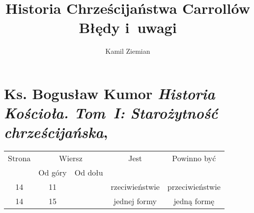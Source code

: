\documentclass[a4paper,11pt]{article}
\title{Historia Chrześcijaństwa Carrollów \\
  {\Large Błędy i~uwagi}}
\author{Kamil Ziemian}
\begin{document}





\maketitle  %









\section{Ks. Bogusław Kumor
  \textit{Historia Kościoła. Tom~I: Starożytność chrześcijańska},
  \cite{KumorHistoriaKosciolaVolI2003}}





\begin{center}

  \begin{tabular}{|c|c|c|c|c|}
    \hline
    Strona & \multicolumn{2}{c|}{Wiersz} & Jest
                              & Powinno być \\ \cline{2-3}
    & Od góry & Od dołu & & \\
    \hline
    14 & 11 & & rzeciwieństwie & przeciwieństwie \\
    14 & 15 & & jednej formy & jedną formę \\
    \hline
  \end{tabular}

\end{center}




\end{document}
